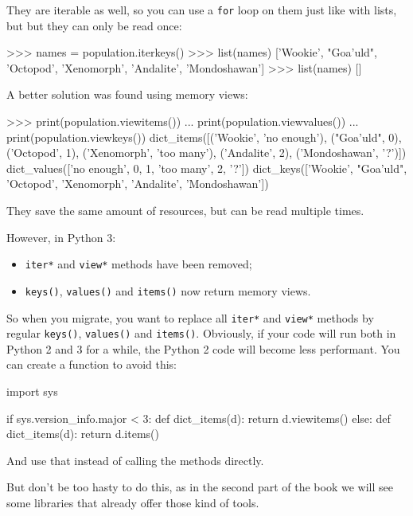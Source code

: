 They are \gls{iterable} as well, so you can use a \lstinline{for} loop on them just like with lists, but but they can only be read once:

\begin{py2}
>>> names = population.iterkeys()
>>> list(names)
['Wookie', "Goa'uld", 'Octopod', 'Xenomorph', 'Andalite', 'Mondoshawan']
>>> list(names)
[]
\end{py2}

A better solution was found using memory views:

\begin{py2}
>>> print(population.viewitems())
... print(population.viewvalues())
... print(population.viewkeys())
dict_items([('Wookie', 'no enough'), ("Goa'uld", 0), ('Octopod', 1), ('Xenomorph', 'too many'), ('Andalite', 2), ('Mondoshawan', '?')])
dict_values(['no enough', 0, 1, 'too many', 2, '?'])
dict_keys(['Wookie', "Goa'uld", 'Octopod', 'Xenomorph', 'Andalite', 'Mondoshawan'])
\end{py2}

They save the same amount of resources, but can be read multiple times.

However, in Python 3:

\begin{itemize}
    \item \lstinline{iter*} and \lstinline{view*} methods have been removed;
    \item \lstinline{keys()}, \lstinline{values()} and \lstinline{items()} now return memory views.
\end{itemize}

So when you migrate, you want to replace all \lstinline{iter*} and \lstinline{view*} methods by regular \lstinline{keys()}, \lstinline{values()} and \lstinline{items()}. Obviously, if your code will run both in Python 2 and 3 for a while, the Python 2 code will become less performant. You can create a function to avoid this:

\begin{py2and3}
import sys

if sys.version_info.major < 3:
    def dict_items(d):
        return d.viewitems()
else:
    def dict_items(d):
        return d.items()
\end{py2and3}

And use that instead of calling the methods directly.

But don't be too hasty to do this, as in the second part of the book we will see some libraries that already offer those kind of tools.


